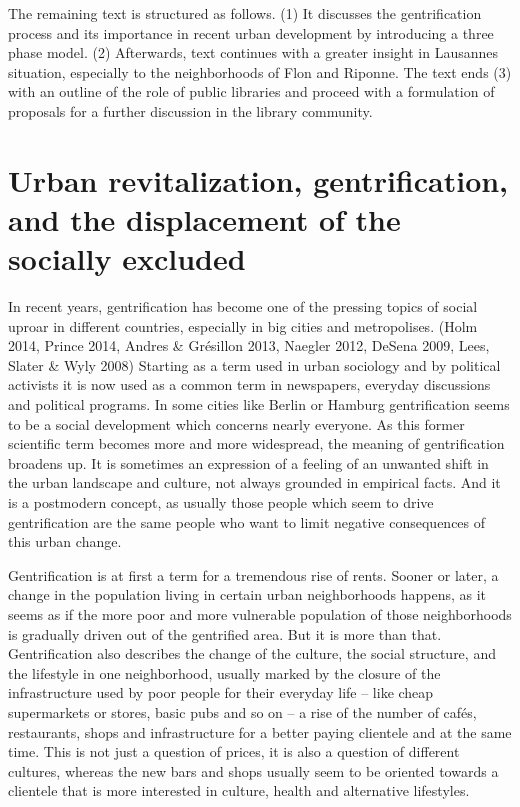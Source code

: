 \documentclass[a4paper,
fontsize=11pt,
oneside,
numbers=noperiodatend,
parskip=half-,
bibliography=totoc,
final
]{scrartcl}
\begin{document}
The remaining text is structured as follows. (1) It discusses the
gentrification process and its importance in recent urban development by
introducing a three phase model. (2) Afterwards, text continues with a
greater insight in Lausannes situation, especially to the neighborhoods
of Flon and Riponne. The text ends (3) with an outline of the role of
public libraries and proceed with a formulation of proposals for a
further discussion in the library community.

\section{Urban revitalization, gentrification, and the
displacement of the socially
excluded}\label{urban-revitalization-gentrification-and-the-displacement-of-the-socially-excluded}

In recent years, gentrification has become one of the pressing topics of
social uproar in different countries, especially in big cities and
metropolises. (Holm 2014, Prince 2014, Andres \& Grésillon 2013, Naegler
2012, DeSena 2009, Lees, Slater \& Wyly 2008) Starting as a term used in
urban sociology and by political activists it is now used as a common
term in newspapers, everyday discussions and political programs. In some
cities like Berlin or Hamburg gentrification seems to be a social
development which concerns nearly everyone. As this former scientific
term becomes more and more widespread, the meaning of gentrification
broadens up. It is sometimes an expression of a feeling of an unwanted
shift in the urban landscape and culture, not always grounded in
empirical facts. And it is a postmodern concept, as usually those people
which seem to drive gentrification are the same people who want to limit
negative consequences of this urban change.

Gentrification is at first a term for a tremendous rise of rents. Sooner
or later, a change in the population living in certain urban
neighborhoods happens, as it seems as if the more poor and more
vulnerable population of those neighborhoods is gradually driven out of
the gentrified area. But it is more than that. Gentrification also
describes the change of the culture, the social structure, and the
lifestyle in one neighborhood, usually marked by the closure of the
infrastructure used by poor people for their everyday life -- like cheap
supermarkets or stores, basic pubs and so on -- a rise of the number of
cafés, restaurants, shops and infrastructure for a better paying
clientele and at the same time. This is not just a question of prices,
it is also a question of different cultures, whereas the new bars and
shops usually seem to be oriented towards a clientele that is more
interested in culture, health and alternative lifestyles.
\end{document}
